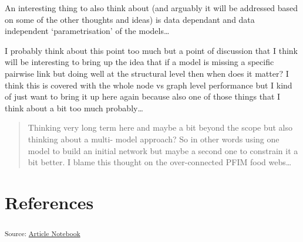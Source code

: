 \documentclass[
]{agujournal2019}
\begin{document}
An interesting thing to also think about (and arguably it will be
addressed based on some of the other thoughts and ideas) is data
dependant and data independent `parametrisation' of the models\ldots{}

I probably think about this point too much but a point of discussion
that I think will be interesting to bring up the idea that if a model is
missing a specific pairwise link but doing well at the structural level
then when does it matter? I think this is covered with the whole node vs
graph level performance but I kind of just want to bring it up here
again because also one of those things that I think about a bit too much
probably\ldots{}

\begin{quote}
Thinking very long term here and maybe a bit beyond the scope but also
thinking about a multi- model approach? So in other words using one
model to build an initial network but maybe a second one to constrain it
a bit better. I blame this thought on the over-connected PFIM food
webs\ldots{}
\end{quote}

\section*{References}\label{references}

\vspace{1em}

\textsubscript{Source:
\href{https://BecksLab.github.io/ms_t_is_for_topology/index.qmd.html}{Article
Notebook}}
\end{document}
